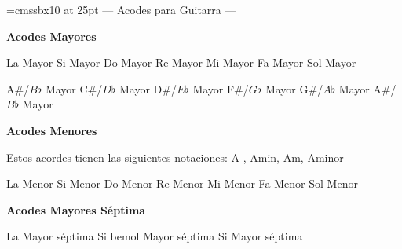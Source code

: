 %
\font\myHugeSF=cmssbx10 at 25pt
\newcommand{\myTitleFont}{\Huge\myHugeSF}
\ifguitarra
{}
\chead{\CHeadFont ({\rm\thepage})}
\rhead{\RHeadFont\RelDate}
{\parindent 8pt
        {\myTitleFont --- Acodes para Guitarra ---}}\par
\vskip 20pt
\textbf{Acodes Mayores}

\small
\upchord{\AGuitar}La Mayor \upchord{\BGuitar}Si Mayor \upchord{\CGuitar}Do Mayor \upchord{\DGuitar}Re Mayor \upchord{\EGuitar}Mi Mayor \upchord{\FGuitar}Fa Mayor \upchord{\GGuitar}Sol Mayor

\upchord{\AsGuitar}A\#/$B\flat$ Mayor \upchord{\CsGuitar}C\#/$D\flat$ Mayor \upchord{\DsGuitar}D\#/$E\flat$ Mayor  \upchord{\FsGuitar}F\#/$G\flat$ Mayor \upchord{\GsGuitar}G\#/$A\flat$ Mayor \upchord{\AsGuitar}A\#/$B\flat$ Mayor
\normalsize

\vskip 20pt
\textbf{Acodes Menores}

Estos acordes tienen las siguientes notaciones:
A-, Amin, Am, Aminor\hfill\null\break
\vskip 20pt

\small
\upchord{\AmGuitar}La Menor \upchord{\BmGuitar}Si Menor \upchord{\CmGuitar}Do Menor \upchord{\DmGuitar}Re Menor \upchord{\EmGuitar}Mi Menor \upchord{\FmGuitar}Fa Menor \upchord{\GmGuitar}Sol Menor

      
\normalsize

\vskip 20pt
\textbf{Acodes Mayores S\'eptima}

\upchord{\AsevenGuitar}La Mayor s\'eptima \hfill
\upchord{\BflatsevenGuitar}Si bemol Mayor s\'eptima \hfill
\upchord{\BsevenGuitar}Si Mayor s\'eptima \hfill
{} \hfill\null\break
\vskip 20pt
 \hfill
{} \hfill
{} \hfill
{} \hfill\null\break
\vskip 20pt
 \hfill
{} \hfill
{} \hfill
{} \hfill\null\break

